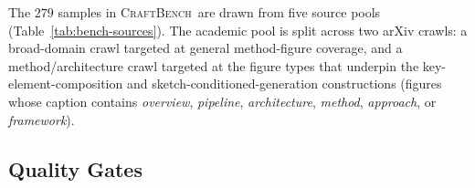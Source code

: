 \documentclass{article}
\newcommand{\CrafterBench}{\textsc{CraftBench}\xspace}
\begin{document}
The $279$ samples in \CrafterBench\ are drawn from five source pools (Table~\ref{tab:bench-sources}). The academic pool is split across two arXiv crawls: a broad-domain crawl targeted at general method-figure coverage, and a method/architecture crawl targeted at the figure types that underpin the key-element-composition and sketch-conditioned-generation constructions (figures whose caption contains \textit{overview}, \textit{pipeline}, \textit{architecture}, \textit{method}, \textit{approach}, or \textit{framework}).

\begin{table}[h]
\centering
\caption{Source pools feeding \CrafterBench. Each surviving sample passes the seven-stage quality pipeline of Appendix~\ref{app:bench-qc}; NeurIPS spotlight + oral posters were also crawled but none survived the gates.}
\label{tab:bench-sources}
\end{table}

\subsection{Quality Gates}
\label{app:bench-qc}
\end{document}
